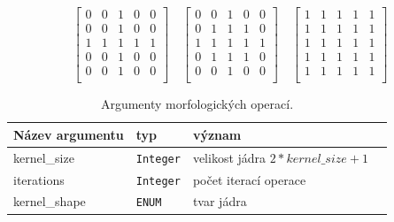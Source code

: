 \documentclass[
  field=ainfp,
  master=true,
  biblatex,
  sourcecodes=false,
  theorems=false,
  glossaries,
  index
]{kidiplom}
\begin{document}
$$
\begin{bmatrix} 
0 & 0 & 1 & 0 & 0 \\
0 & 0 & 1 & 0 & 0 \\
1 & 1 & 1 & 1 & 1 \\
0 & 0 & 1 & 0 & 0 \\
0 & 0 & 1 & 0 & 0 \\
\end{bmatrix}
\quad
\begin{bmatrix} 
0 & 0 & 1 & 0 & 0 \\
0 & 1 & 1 & 1 & 0 \\
1 & 1 & 1 & 1 & 1 \\
0 & 1 & 1 & 1 & 0 \\
0 & 0 & 1 & 0 & 0 \\
\end{bmatrix}
\quad
\begin{bmatrix} 
1 & 1 & 1 & 1 & 1 \\
1 & 1 & 1 & 1 & 1 \\
1 & 1 & 1 & 1 & 1 \\
1 & 1 & 1 & 1 & 1 \\
1 & 1 & 1 & 1 & 1 \\
\end{bmatrix}
$$

\begin{table}[H]
\centering
\begin{tabular}{|l|l|l|l|}
\hline
\textbf{Název argumentu} & \textbf{typ} & \textbf{význam}
\\ \hline
kernel\_size & \texttt{Integer} & velikost jádra $2 * kernel\_size + 1$
\\ \hline
iterations & \texttt{Integer} & počet iterací operace
\\ \hline
kernel\_shape & \texttt{ENUM}  & tvar jádra
\\ \hline
\end{tabular}
\caption{Argumenty morfologických operací.}
\end{table}
\end{document}
